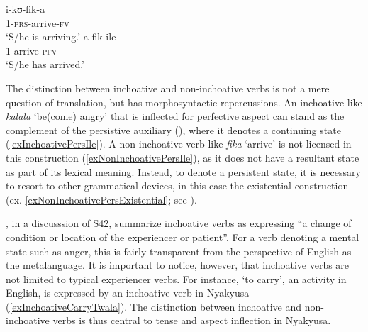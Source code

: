 \begin{exe}
\ex \label{exNonInchoativePRS}\gll i-kʊ-fik-a\\
1-\textsc{prs}-arrive-\textsc{fv}\\
\glt `S/he is arriving.'
\ex \label{exNonInchoativePFV} \gll a-fik-ile\\
1-arrive-\textsc{pfv}\\
\glt `S/he has arrived.'
\end{exe}

The distinction between inchoative and non-inchoative verbs is not a mere question of translation, but has morphosyntactic repercussions. An inchoative like \textit{kalala} `be(come) angry' that is inflected for perfective aspect can stand as the complement of the persistive auxiliary (), where it denotes a continuing state (\ref{exInchoativePersIle}). A non-inchoative verb like \textit{fika} `arrive' is not licensed in this construction (\ref{exNonInchoativePersIle}), as it does not have a resultant state as part of its lexical meaning. Instead, to denote a persistent state, it is necessary to resort to other grammatical devices, in this case the existential construction (ex. \ref{exNonInchoativePersExistential}; see ).

\begin{exe}
\label{exInchoativePersIle}
\end{exe}

\citet[165]{BotneRKershnerT2000}, in a discusssion of  S42, summarize inchoative verbs as expressing ``a change of condition or location of the experiencer or patient''. For a verb denoting a mental state such as anger, this is fairly transparent from the perspective of English as the metalanguage. It is important to notice, however, that inchoative verbs are not limited to typical experiencer verbs. For instance, `to carry', an activity in English, is expressed by an inchoative verb in Nyakyusa (\ref{exInchoativeCarryTwala}). The distinction between inchoative and non-inchoative verbs is thus central to tense and aspect inflection in Nyakyusa.

